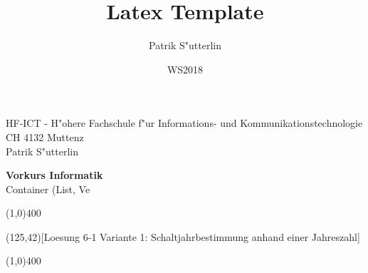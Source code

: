 \documentclass[a4paper,10pt]{article}
\title{Latex Template}
\author{Patrik S"utterlin}
\date{WS2018}
\begin{document}
HF-ICT - H"ohere Fachschule f"ur Informations- und Kommunikationstechnologie\\
CH 4132 Muttenz\\
Patrik S"utterlin

\vspace{2mm}

\begin{center}
{\Large \bf Vorkurs Informatik}\\
Container (List, Ve
\end{center}

\vspace{2mm}
\line(1,0){400}
\vspace{5mm}


\begin{center}
\begin{struktogramm}(125,42)[Loesung 6-1 Variante 1: Schaltjahrbestimmung anhand einer Jahreszahl]
    \change
    \ifend
  \change
    \change
    \ifend
  \ifend
\end{struktogramm}
\end{center}
\line(1,0){400}
\vspace{4mm}
\end{document}
